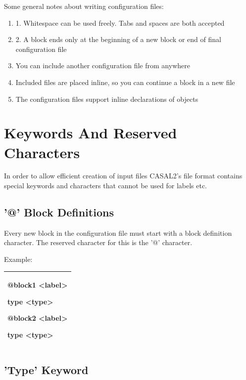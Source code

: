\documentclass[a4paper,11pt,twoside,pdftex,draft]{article}
\begin{document}
Some general notes about writing configuration files:

\begin{enumerate}
\def\labelenumi{\arabic{enumi}.}
\item
  1. Whitespace can be used freely. Tabs and spaces are both accepted
\item
  2. A block ends only at the beginning of a new block or end of final
  configuration file
\item
  You can include another configuration file from anywhere
\item
  Included files are placed inline, so you can continue a block in a new
  file
\item
  The configuration files support inline declarations of objects
\end{enumerate}

\hypertarget{keywords-and-reserved-characters}{%
\section{Keywords And Reserved
Characters}\label{keywords-and-reserved-characters}}

In order to allow efficient creation of input files CASAL2's file format
contains special keywords and characters that cannot be used for labels
etc.

\hypertarget{block-definitions}{%
\subsection{'@' Block Definitions}\label{block-definitions}}

Every new block in the configuration file must start with a block
definition character. The reserved character for this is the '@'
character.

Example:

\begin{longtable}[]{@{}l@{}}
\toprule
\endhead
\begin{minipage}[t]{0.97\columnwidth}\raggedright
@block1 \textless label\textgreater{}

type \textless type\textgreater{}

@block2 \textless label\textgreater{}

type \textless type\textgreater{}\strut
\end{minipage}\tabularnewline
\bottomrule
\end{longtable}

\hypertarget{type-keyword}{%
\subsection{'Type' Keyword}\label{type-keyword}}
\end{document}
